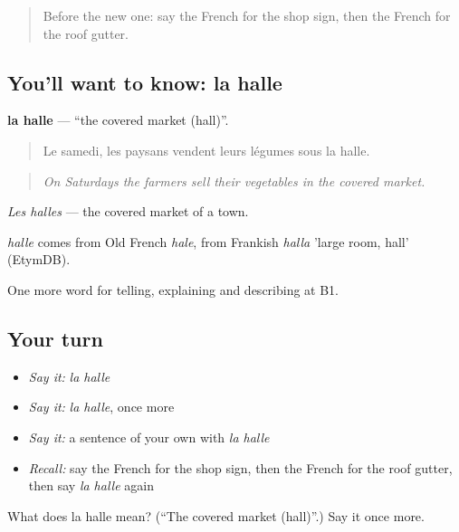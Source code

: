\label{lesson:FR-C442-halle}



\begin{quote}
Before the new one: say the French for the shop sign, then the French for the roof gutter.
\end{quote}

\subsection*{You'll want to know: la halle}
\textbf{la halle} — \textquotedblleft{}the covered market (hall)\textquotedblright{}.

\begin{quote}
Le samedi, les paysans vendent leurs légumes sous la halle.
\end{quote}

\begin{quote}
\emph{On Saturdays the farmers sell their vegetables in the covered market.}
\end{quote}

\emph{Les halles} — the covered market of a town.

\begin{cousinweb}
\emph{halle} comes from Old French \emph{hale}, from Frankish \emph{halla} 'large room, hall' (EtymDB).
\end{cousinweb}

\begin{grammarlens}[title={What you've built}]
One more word for telling, explaining and describing at B1.
\end{grammarlens}

\subsection*{Your turn}
\begin{itemize}
\raggedright
  \item \emph{Say it:} \emph{la halle}
  \item \emph{Say it:} \emph{la halle}, once more
  \item \emph{Say it:} a sentence of your own with \emph{la halle}
  \item \emph{Recall:} say the French for the shop sign, then the French for the roof gutter, then say \emph{la halle} again
\end{itemize}

\begin{tcolorbox}[breakable,colback=teal!4,colframe=teal!35!black,title={Before you move on}]
What does la halle mean? (\textquotedblleft{}The covered market (hall)\textquotedblright{}.) Say it once more.
\end{tcolorbox}

